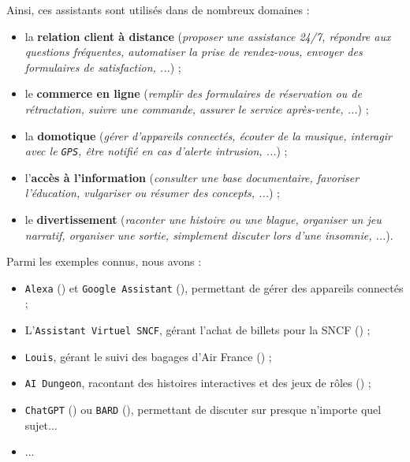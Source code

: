 		
		Ainsi, ces assistants sont utilisés dans de nombreux domaines :
		\begin{itemize}
			\item la \textbf{relation client à distance} (\textit{proposer une assistance 24/7, répondre aux questions fréquentes, automatiser la prise de rendez-vous, envoyer des formulaires de satisfaction, ...}) ;
			\item le \textbf{commerce en ligne} (\textit{remplir des formulaires de réservation ou de rétractation, suivre une commande, assurer le service après-vente, ...}) ;
			\item la \textbf{domotique} (\textit{gérer d'appareils connectés, écouter de la musique, interagir avec le \texttt{GPS}, être notifié en cas d'alerte intrusion, ...}) ;
			\item l'\textbf{accès à l'information} (\textit{consulter une base documentaire, favoriser l'éducation, vulgariser ou résumer des concepts, ...}) ; 
			\item le \textbf{divertissement} (\textit{raconter une histoire ou une blague, organiser un jeu narratif, organiser une sortie, simplement discuter lors d'une insomnie, ...}).
		\end{itemize}
		
		\begin{leftBarExamples}
			Parmi les exemples connus, nous avons :
			\begin{itemize}
				\item \texttt{Alexa} (\cite{alexa-internet:2018:keyword-research-competitor}) et \texttt{Google Assistant} (\cite{google:2016:google-assistant-your}), permettant de gérer des appareils connectés ;
				\item L'\texttt{Assistant Virtuel SNCF}, gérant l'achat de billets pour la SNCF (\cite{sncf:2018:agent-virtuel-sncf}) ;
				\item \texttt{Louis}, gérant le suivi des bagages d'Air France (\cite{air-france:2017:louis}) ;
				\item \texttt{AI Dungeon}, racontant des histoires interactives et des jeux de rôles (\cite{latitude-inc.-oasis-tech-inc.:2019:ai-dungeon}) ;
				\item \texttt{ChatGPT} (\cite{openai:2023:chatgpt}) ou \texttt{BARD} (\cite{google:2023:bard-chat-based}), permettant de discuter sur presque n'importe quel sujet...
				\item ...
			\end{itemize}
		\end{leftBarExamples}
	
